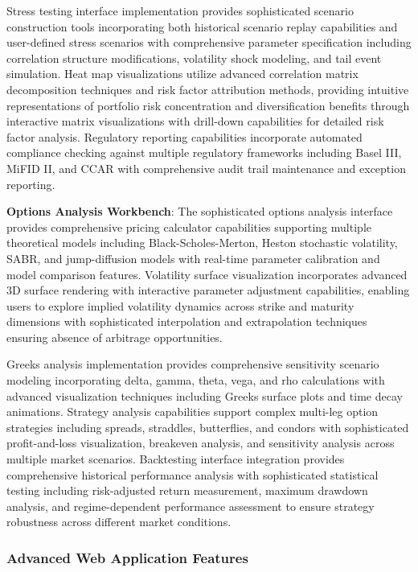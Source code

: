 \documentclass[12pt,a4paper]{article}
\theoremstyle{definition}
\theoremstyle{remark}
\begin{document}
Stress testing interface implementation provides sophisticated scenario construction tools incorporating both historical scenario replay capabilities and user-defined stress scenarios with comprehensive parameter specification including correlation structure modifications, volatility shock modeling, and tail event simulation. Heat map visualizations utilize advanced correlation matrix decomposition techniques and risk factor attribution methods, providing intuitive representations of portfolio risk concentration and diversification benefits through interactive matrix visualizations with drill-down capabilities for detailed risk factor analysis. Regulatory reporting capabilities incorporate automated compliance checking against multiple regulatory frameworks including Basel III, MiFID II, and CCAR with comprehensive audit trail maintenance and exception reporting.

\textbf{Options Analysis Workbench}: The sophisticated options analysis interface provides comprehensive pricing calculator capabilities supporting multiple theoretical models including Black-Scholes-Merton, Heston stochastic volatility, SABR, and jump-diffusion models with real-time parameter calibration and model comparison features. Volatility surface visualization incorporates advanced 3D surface rendering with interactive parameter adjustment capabilities, enabling users to explore implied volatility dynamics across strike and maturity dimensions with sophisticated interpolation and extrapolation techniques ensuring absence of arbitrage opportunities.

Greeks analysis implementation provides comprehensive sensitivity scenario modeling incorporating delta, gamma, theta, vega, and rho calculations with advanced visualization techniques including Greeks surface plots and time decay animations. Strategy analysis capabilities support complex multi-leg option strategies including spreads, straddles, butterflies, and condors with sophisticated profit-and-loss visualization, breakeven analysis, and sensitivity analysis across multiple market scenarios. Backtesting interface integration provides comprehensive historical performance analysis with sophisticated statistical testing including risk-adjusted return measurement, maximum drawdown analysis, and regime-dependent performance assessment to ensure strategy robustness across different market conditions.

\subsubsection{Advanced Web Application Features}
\end{document}
